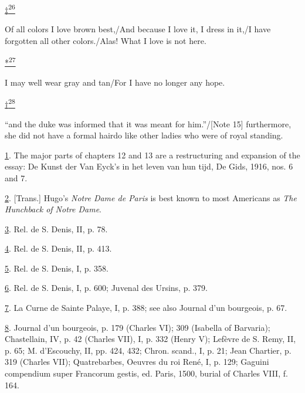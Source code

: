 \protect\hypertarget{23_NOTES.xhtmlux5cux23id_2702}{\protect\hyperlink{20_ILLUSTRATIONS_FOLLOW_PAGE.xhtmlux5cux23id_2701}{‡\textsuperscript{26}}}
Of all colors I love brown best,/And because I love it, I dress in it,/I
have forgotten all other colors./Alas! What I love is not here.

\protect\hypertarget{23_NOTES.xhtmlux5cux23id_2704}{\protect\hyperlink{20_ILLUSTRATIONS_FOLLOW_PAGE.xhtmlux5cux23id_2703}{*\textsuperscript{27}}}
I may well wear gray and tan/For I have no longer any hope.

\protect\hypertarget{23_NOTES.xhtmlux5cux23id_2706}{\protect\hyperlink{20_ILLUSTRATIONS_FOLLOW_PAGE.xhtmlux5cux23id_2705}{†\textsuperscript{28}}}
``and the duke was informed that it was meant for him.''/{[}Note 15{]}
furthermore, she did not have a formal hairdo like other ladies who were
of royal standing.

\protect\hypertarget{23_NOTES.xhtmlux5cux23id_471}{\protect\hyperlink{19_Chapter_Twelve__ART_IN_LIFE.xhtmlux5cux23id_470}{1}}.
The major parts of chapters 12 and 13 are a restructuring and expansion
of the essay: De Kunst der Van Eyck's in het leven van hun tijd, De
Gids, 1916, nos. 6 and 7.

\protect\hypertarget{23_NOTES.xhtmlux5cux23id_469}{\protect\hyperlink{19_Chapter_Twelve__ART_IN_LIFE.xhtmlux5cux23id_468}{2}}.
{[}Trans.{]} Hugo's \emph{Notre Dame de Paris} is best known to most
Americans as \emph{The Hunchback of Notre Dame}.

\protect\hypertarget{23_NOTES.xhtmlux5cux23id_467}{\protect\hyperlink{19_Chapter_Twelve__ART_IN_LIFE.xhtmlux5cux23id_466}{3}}.
Rel. de S. Denis, II, p. 78.

\protect\hypertarget{23_NOTES.xhtmlux5cux23id_465}{\protect\hyperlink{20_ILLUSTRATIONS_FOLLOW_PAGE.xhtmlux5cux23id_464}{4}}.
Rel. de S. Denis, II, p. 413.

\protect\hypertarget{23_NOTES.xhtmlux5cux23id_463}{\protect\hyperlink{20_ILLUSTRATIONS_FOLLOW_PAGE.xhtmlux5cux23id_462}{5}}.
Rel. de S. Denis, I, p. 358.

\protect\hypertarget{23_NOTES.xhtmlux5cux23id_461}{\protect\hyperlink{20_ILLUSTRATIONS_FOLLOW_PAGE.xhtmlux5cux23id_460}{6}}.
Rel. de S. Denis, I, p. 600; Juvenal des Ursins, p. 379.

\protect\hypertarget{23_NOTES.xhtmlux5cux23id_459}{\protect\hyperlink{20_ILLUSTRATIONS_FOLLOW_PAGE.xhtmlux5cux23id_458}{7}}.
La Curne de Sainte Palaye, I, p. 388; see also Journal d'un bourgeois,
p. 67.

\protect\hypertarget{23_NOTES.xhtmlux5cux23id_457}{\protect\hyperlink{20_ILLUSTRATIONS_FOLLOW_PAGE.xhtmlux5cux23id_456}{8}}.
Journal d'un bourgeois, p. 179 (Charles VI); 309 (Isabella of Barvaria);
Chastellain, IV, p. 42 (Charles VII), I, p. 332 (Henry V); Lefèvre de S.
Remy, II, p. 65; M. d'Escouchy, II, pp. 424, 432; Chron. scand., I, p.
21; Jean Chartier, p. 319 (Charles VII); Quatrebarbes, Oeuvres du roi
René, I, p. 129; Gaguini compendium super Francorum gestis, ed. Paris,
1500, burial of Charles VIII, f. 164.

